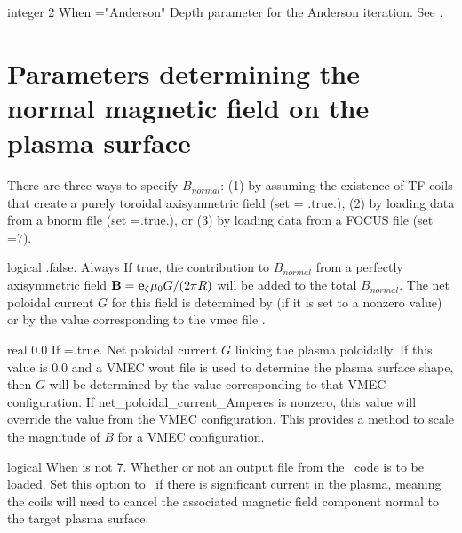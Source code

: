 \myhrule

{integer}
{2}
{When ={\ttfamily "Anderson"}}
{Depth parameter for the Anderson iteration. See \cite{Tonatiuh}.}

\myhrule

\section{Parameters determining the normal magnetic field on the plasma surface}

There are three ways to specify $B_{normal}$: (1) by assuming the existence of TF coils that create a purely toroidal axisymmetric field
(set  = {\ttfamily .true.}), (2) by loading data from a bnorm file (set ={\ttfamily .true.}), or
(3) by loading data from a FOCUS file (set =7).

\myhrule

{logical}
{{\ttfamily .false.}}
{Always}
{If true, the contribution to $B_{normal}$ from a perfectly axisymmetric field ${\mathbf B} = {\mathbf e}_{\zeta} \mu_0 G /(2\pi R)$
will be added to the total $B_{normal}$. The net poloidal current $G$ for this field is determined by 
(if it is set to a nonzero value) or by the value corresponding to the vmec file .}

\myhrule

{real}
{0.0}
{If ={\ttfamily .true.}}
{Net poloidal current $G$ linking the plasma poloidally. If this value is 0.0 and a VMEC wout file is used to determine the plasma surface shape,
then $G$ will be determined by the value corresponding to that VMEC configuration. If {\ttfamily net\_poloidal\_current\_Amperes} is nonzero,
this value will override the value from the VMEC configuration. This provides a method to scale the magnitude of $B$ for a VMEC configuration.}

\myhrule

{logical}
{\false}
{When  is not 7.}
{Whether or not an output file from the \bnorm~code is to be loaded.
Set this option to \true~if there is significant current in the plasma,
meaning the coils will need to cancel the associated magnetic field component normal
to the target plasma surface.
}

